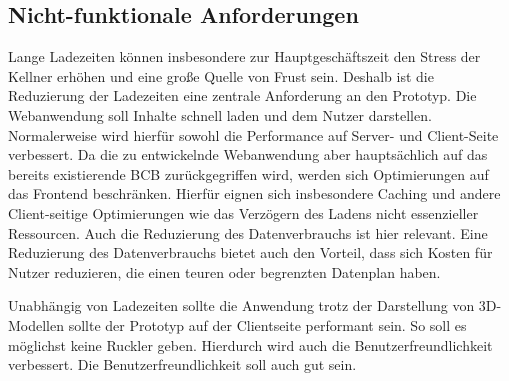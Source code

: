 \subsection{Nicht-funktionale Anforderungen}

Lange Ladezeiten können insbesondere zur Hauptgeschäftszeit den Stress der Kellner erhöhen und eine große Quelle von Frust sein. Deshalb ist die Reduzierung der Ladezeiten eine zentrale Anforderung an den Prototyp. Die Webanwendung soll Inhalte schnell laden und dem Nutzer darstellen. Normalerweise wird hierfür sowohl die Performance auf Server- und Client-Seite verbessert. Da die zu entwickelnde Webanwendung aber hauptsächlich auf das bereits existierende \ac{BCB} zurückgegriffen wird, werden sich Optimierungen auf das Frontend beschränken. Hierfür eignen sich insbesondere Caching und andere Client-seitige Optimierungen wie das Verzögern des Ladens nicht essenzieller Ressourcen. Auch die Reduzierung des Datenverbrauchs ist hier relevant. Eine Reduzierung des Datenverbrauchs bietet auch den Vorteil, dass sich Kosten für Nutzer reduzieren, die einen teuren oder begrenzten Datenplan haben.

Unabhängig von Ladezeiten sollte die Anwendung trotz der Darstellung von 3D-Modellen sollte der Prototyp auf der Clientseite performant sein. So soll es möglichst keine Ruckler geben. Hierdurch wird auch die Benutzerfreundlichkeit verbessert. Die Benutzerfreundlichkeit soll auch gut sein.
